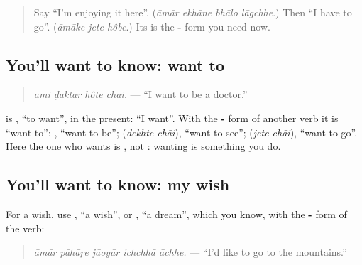 \label{lesson:BN-C272-hote-chai}



\begin{quote}
Say \textquotedblleft{}I'm enjoying it here\textquotedblright{}. (\emph{āmār ekhāne bhālo lāgchhe}.) Then \textquotedblleft{}I have to go\textquotedblright{}. (\emph{āmāke jete hôbe}.) Its \textbf{} is the \textbf{-} form you need now.
\end{quote}

\subsection*{You'll want to know: want to}
\begin{quote}
\textbf{   }
\end{quote}

\begin{quote}
\emph{āmi ḍāktār hôte chāi.} — \textquotedblleft{}I want to be a doctor.\textquotedblright{}
\end{quote}

\textbf{} is \textbf{}, \textquotedblleft{}to want\textquotedblright{}, in the present: \textquotedblleft{}I want\textquotedblright{}. With the \textbf{-} form of another verb it is \textquotedblleft{}want to\textquotedblright{}: \textbf{ }, \textquotedblleft{}want to be\textquotedblright{}; \textbf{ } (\emph{dekhte chāi}), \textquotedblleft{}want to see\textquotedblright{}; \textbf{ } (\emph{jete chāi}), \textquotedblleft{}want to go\textquotedblright{}. Here the one who wants is \textbf{}, not \textbf{}: wanting is something you do.

\subsection*{You'll want to know: my wish}
For a wish, use \textbf{}, \textquotedblleft{}a wish\textquotedblright{}, or \textbf{}, \textquotedblleft{}a dream\textquotedblright{}, which you know, with the \textbf{-} form of the verb:

\begin{quote}
\textbf{    }
\end{quote}

\begin{quote}
\emph{āmār pāhāṛe jāoyār ichchhā āchhe.} — \textquotedblleft{}I'd like to go to the mountains.\textquotedblright{}
\end{quote}

